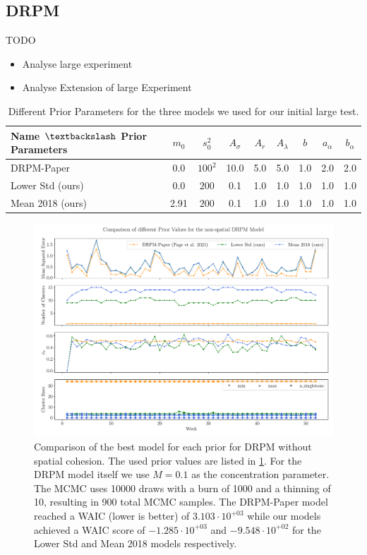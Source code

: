 \documentclass[12pt,a4paper]{article}
\begin{document}
\subsection{DRPM}
TODO
\begin{itemize}
    \item Analyse large experiment
    \item Analyse Extension of large Experiment
\end{itemize}

\begin{table}[h]
\centering
\begin{tabular}{lcccccccc}
\toprule
Name $\textbackslash$ Prior Parameters & $m_0$ & $s_0^2$ & $A_\sigma$ & $A_r$ & $A_\lambda$ & $b$ & $a_\alpha$ & $b_\alpha$ \\
\midrule
DRPM-Paper \cite{Page2021-Temporal} & 0.0   & $100^2$ & 10.0         & 5.0     & 5.0           & 1.0   & 2.0        & 2.0        \\
Lower Std (ours)                                & 0.0   & $200$   & 0.1        & 1.0     & 1.0           & 1.0   & 1.0          & 1.0          \\
Mean 2018 (ours)                                & 2.91  & $200$  & 0.1        & 1.0     & 1.0           & 1.0   & 1.0          & 1.0         \\
\bottomrule
\end{tabular}
\caption{Different Prior Parameters for the three models we used for our initial large test.}
\label{tab:DRPMPriorParam}
\end{table}

\begin{figure}
    \centering
    \includegraphics[width=.95\linewidth]{./imgs/drpm_base_models_comparison.pdf}
    \caption{Comparison of the best model for each prior for DRPM without spatial cohesion.
    The used prior values are listed in \cref{tab:DRPMPriorParam}. For the DRPM model itself we use
    $M=0.1$ as the concentration parameter. The MCMC uses 10000 draws with a burn of 1000 and a
    thinning of 10, resulting in 900 total MCMC samples. The DRPM-Paper model reached a WAIC (lower is better) of
    $3.103 \cdot 10^{+03}$ while our models achieved a WAIC score of $-1.285 \cdot 10^{+03}$ and
    $-9.548 \cdot 10^{+02}$ for the Lower Std and Mean 2018 models respectively.}
    \label{fig:drpm_base_models_comparison}
\end{figure}
\end{document}
